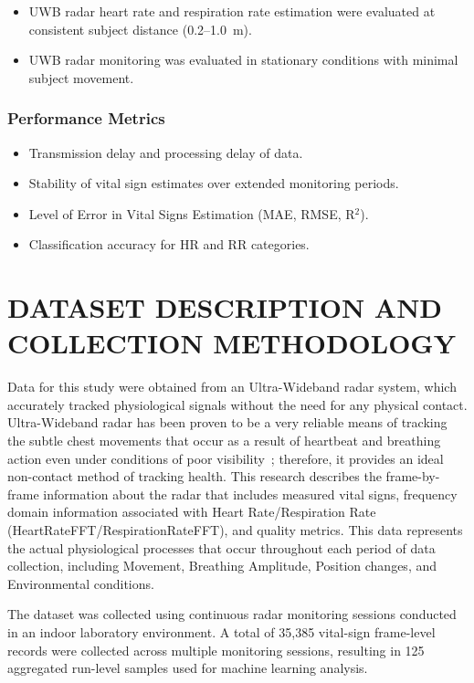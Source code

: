 \documentclass[conference]{IEEEtran}
\begin{document}
\begin{itemize}
\item UWB radar heart rate and respiration rate estimation were evaluated at consistent subject distance (0.2--1.0~m).
\item UWB radar monitoring was evaluated in stationary conditions with minimal subject movement.
\end{itemize}

\subsubsection{Performance Metrics}

\begin{itemize}
\item Transmission delay and processing delay of data.
\item Stability of vital sign estimates over extended monitoring periods.
\item Level of Error in Vital Signs Estimation (MAE, RMSE, R$^2$).
\item Classification accuracy for HR and RR categories.
\end{itemize}

\section{DATASET DESCRIPTION AND COLLECTION METHODOLOGY}

Data for this study were obtained from an Ultra-Wideband radar system, which accurately tracked physiological signals without the need for any physical contact. Ultra-Wideband radar has been proven to be a very reliable means of tracking the subtle chest movements that occur as a result of heartbeat and breathing action even under conditions of poor visibility~\cite{ref1,ref2,ref3}; therefore, it provides an ideal non-contact method of tracking health. This research describes the frame-by-frame information about the radar that includes measured vital signs, frequency domain information associated with Heart Rate/Respiration Rate (HeartRateFFT/RespirationRateFFT), and quality metrics. This data represents the actual physiological processes that occur throughout each period of data collection, including Movement, Breathing Amplitude, Position changes, and Environmental conditions.

The dataset was collected using continuous radar monitoring sessions conducted in an indoor laboratory environment. A total of 35,385 vital-sign frame-level records were collected across multiple monitoring sessions, resulting in 125 aggregated run-level samples used for machine learning analysis.
\end{document}
